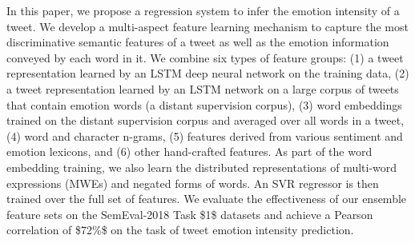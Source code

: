 In this paper, we propose a regression system to infer the emotion intensity of a tweet. We develop a multi-aspect feature learning mechanism to capture the most discriminative semantic features of a tweet as well as the emotion information conveyed by each word in it. We combine six types of feature groups: (1) a tweet representation learned by an LSTM deep neural network on the training data, (2) a tweet representation learned by an LSTM network on a large corpus of tweets that contain emotion words (a distant supervision corpus), (3) word embeddings trained on the distant supervision corpus and averaged over all words in a tweet, (4) word and character n-grams, (5) features derived from various sentiment and emotion lexicons, and (6) other hand-crafted features. As part of the word embedding training, we also learn the distributed representations of multi-word expressions (MWEs) and negated forms of words. An SVR regressor is then trained over the full set of features. We evaluate the effectiveness of our ensemble feature sets on the SemEval-2018 Task \$1\$ datasets and achieve a Pearson correlation of \$72\%\$ on the task of tweet emotion intensity prediction.
